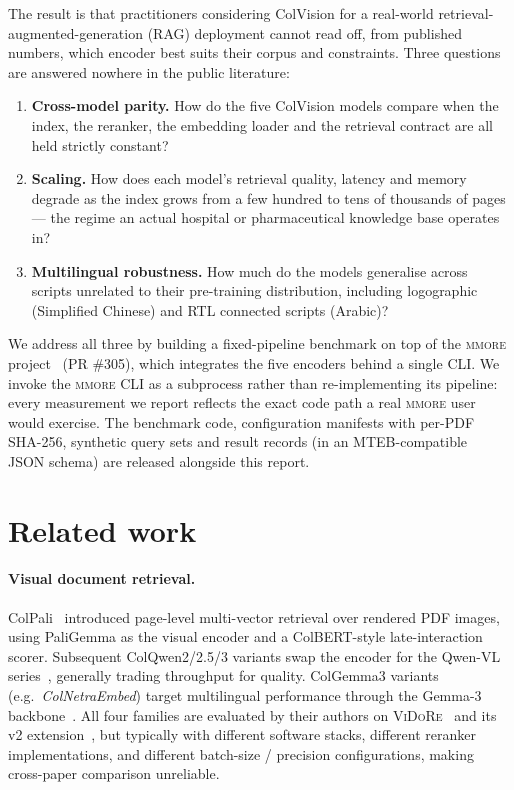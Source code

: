 \documentclass[10pt,a4paper]{article}
\begin{document}
The result is that practitioners considering ColVision for a real-world
retrieval-augmented-generation (RAG) deployment cannot read off, from
published numbers, which encoder best suits their corpus and constraints.
Three questions are answered nowhere in the public literature:

\begin{enumerate}
  \item \textbf{Cross-model parity.} How do the five ColVision models compare
    when the index, the reranker, the embedding loader and the retrieval
    contract are all held strictly constant?
  \item \textbf{Scaling.} How does each model's retrieval quality, latency
    and memory degrade as the index grows from a few hundred to tens of
    thousands of pages --- the regime an actual hospital or pharmaceutical
    knowledge base operates in?
  \item \textbf{Multilingual robustness.} How much do the models generalise
    across scripts unrelated to their pre-training distribution, including
    logographic (Simplified Chinese) and RTL connected scripts (Arabic)?
\end{enumerate}

We address all three by building a fixed-pipeline benchmark on top of the
\textsc{mmore} project~\cite{mmore2024} (PR \#305), which integrates the five
encoders behind a single CLI. We invoke the \textsc{mmore} CLI as a
subprocess rather than re-implementing its pipeline: every measurement we
report reflects the exact code path a real \textsc{mmore} user would
exercise. The benchmark code, configuration manifests with per-PDF SHA-256,
synthetic query sets and result records (in an
\textsc{MTEB}-compatible~\cite{muennighoff2023mteb} JSON schema) are
released alongside this report.

\section{Related work}

\paragraph{Visual document retrieval.} ColPali~\cite{faysse2024colpali}
introduced page-level multi-vector retrieval over rendered PDF images, using
PaliGemma as the visual encoder and a ColBERT-style late-interaction scorer.
Subsequent ColQwen2/2.5/3 variants swap the encoder for the Qwen-VL
series~\cite{bai2023qwenvl}, generally trading throughput for quality.
ColGemma3 variants (e.g.~\textit{ColNetraEmbed}) target multilingual
performance through the Gemma-3 backbone~\cite{team2024gemma3}. All four
families are evaluated by their authors on
\textsc{ViDoRe}~\cite{faysse2024vidore} and its v2
extension~\cite{faysse2025vidorev2}, but typically with different software
stacks, different reranker implementations, and different batch-size /
precision configurations, making cross-paper comparison unreliable.
\end{document}
